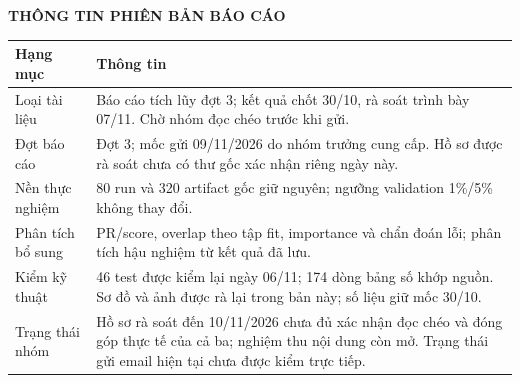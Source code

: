 \documentclass[12pt,a4paper,oneside]{report}
\begin{document}
\thispagestyle{empty}
\vspace*{-1.05cm}
\begin{center}{\bfseries\fontsize{16pt}{20pt}\selectfont\color{HCMUTEDark} THÔNG TIN PHIÊN BẢN BÁO CÁO}\end{center}
\vspace{0.25cm}
\begingroup\fontsize{10.5pt}{13pt}\selectfont\renewcommand{\arraystretch}{1.5}
\begin{tabularx}{\textwidth}{L{4.2cm}Y}\toprule
\textbf{Hạng mục} & \textbf{Thông tin}\\\midrule
Loại tài liệu & Báo cáo tích lũy đợt 3; kết quả chốt 30/10, rà soát trình bày 07/11. Chờ nhóm đọc chéo trước khi gửi.\\
Đợt báo cáo & Đợt 3; mốc gửi 09/11/2026 do nhóm trưởng cung cấp. Hồ sơ được rà soát chưa có thư gốc xác nhận riêng ngày này.\\
Nền thực nghiệm & 80 run và 320 artifact gốc giữ nguyên; ngưỡng validation 1\%/5\% không thay đổi.\\
Phân tích bổ sung & PR/score, overlap theo tập fit, importance và chẩn đoán lỗi; phân tích hậu nghiệm từ kết quả đã lưu.\\
Kiểm kỹ thuật & 46 test được kiểm lại ngày 06/11; 174 dòng bảng số khớp nguồn. Sơ đồ và ảnh được rà lại trong bản này; số liệu giữ mốc 30/10.\\
Trạng thái nhóm & Hồ sơ rà soát đến 10/11/2026 chưa đủ xác nhận đọc chéo và đóng góp thực tế của cả ba; nghiệm thu nội dung còn mở. Trạng thái gửi email hiện tại chưa được kiểm trực tiếp.\\
\bottomrule\end{tabularx}\endgroup
\vspace{0.35cm}
\par
\clearpage
{}
\setcounter{page}{1}
\begingroup\fontsize{10pt}{12pt}\selectfont{}\tableofcontents\endgroup
\clearpage
{}
\begingroup\fontsize{10pt}{12pt}\selectfont{}
\par\vspace{0.45cm}
\makeatletter{}\makeatother
\endgroup\clearpage
{}
\begingroup\fontsize{10pt}{12pt}\selectfont{}
\par\vspace{0.45cm}
\makeatletter{}\makeatother
\endgroup\clearpage
\end{document}
